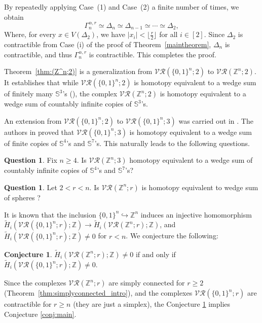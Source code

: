 \documentclass{amsart}
\theoremstyle{definition}
\newtheorem{conj}[theorem]{Conjecture}
\newtheorem{ques}[theorem]{Question}
\theoremstyle{remark}
\numberwithin{equation}{section}
\newcommand{\Sp}{\mathbb{S}}
\newcommand{\f}{\lfloor\frac{r}{2}\rfloor}
\newcommand{\vr}[2]{\mathcal{VR}(#1;#2)}
\def\Z{{\mathbb{Z}}}
\begin{document}
By repeatedly applying Case~(1) and Case~(2) a finite number of times, we obtain
$$
\Gamma_n^{\alpha, r}\simeq \Delta_n \simeq \Delta_{n-1} \simeq \cdots \simeq \Delta_2,
$$
Where, for every $x \in V(\Delta_2)$, we have $|x_i| < \f$ for all $i \in [2]$. Since $\Delta_2$ is contractible from  Case (i) of the proof of Theorem~\ref{maintheorem}, $\Delta_n$ is contractible, and thus $\Gamma_n^{\alpha, r}$ is contractible. This completes the proof.



  


 Theorem~\ref{thm:(Z^n;2)} is a  generalization from $\vr{\{0, 1\}^n}{2}$ to $\vr{\mathbb{Z}^n}{2}$. It establishes that while $\vr{\{0, 1\}^n}{2}$ is homotopy equivalent to a wedge sum of finitely many $\Sp^3$'s (\cite{Adamaszek2021}), the complex $\vr{\mathbb{Z}^n}{2}$ is homotopy equivalent to a wedge sum of countably infinite copies of $\Sp^3$'s.


An extension from $\vr{\{0, 1\}^n}{2}$ to $\vr{\{0, 1\}^n}{3}$ was carried out in \cite{Shukla2023, Ziqin2024}. The authors in \cite{Ziqin2024} proved that $\vr{\{0, 1\}^n}{3}$ is homotopy equivalent to a wedge sum of finite copies of $\Sp^4$'s and $\Sp^7$'s. This naturally leads to the following questions.  

\begin{ques} Fix $n\geq 4$. 
	Is $\vr{\mathbb{Z}^n}{3}$ homotopy equivalent to a wedge sum of countably infinite copies of $\Sp^4$'s and $\Sp^7$'s? 
\end{ques}
\begin{ques}
Let $2 < r < n$.  Is $\vr{\Z^n}{r}$ is homotopy equivalent to  wedge sum of spheres ?
\end{ques}

It is known that the inclusion $\{0,1\}^n \hookrightarrow \Z^n$ induces an injective homomorphism 
$\tilde{H}_i(\vr{\{0, 1\}^n}{r}; \Z) \longrightarrow \tilde{H}_i(\vr{\Z^n}{r}; \Z)$,
and $\tilde{H}_i(\vr{\{0, 1\}^n}{r}; \Z) \neq 0$ for $r<n$. 
We conjecture the following:

 

\begin{conj}\label{conj:homoloyof_lattices_and_cube}
$\tilde{H}_i(\vr{\Z^n}{r}; \Z) \neq 0$ if and only if 
$\tilde{H}_i(\vr{\{0, 1\}^n}{r}; \Z) \neq 0.$

\end{conj}


Since the complexes $\vr{\Z^n}{r}$ are simply connected for $r \geq 2$ (Theorem~\ref{thm:simplyconnected_intro}), and  the complexes $\vr{\{0, 1\}^n}{r}$ are contractible  for $r \geq n$ (they are just a simplex), the Conjecture \ref{conj:homoloyof_lattices_and_cube} implies Conjecture \ref{conj:main}.
\end{document}
